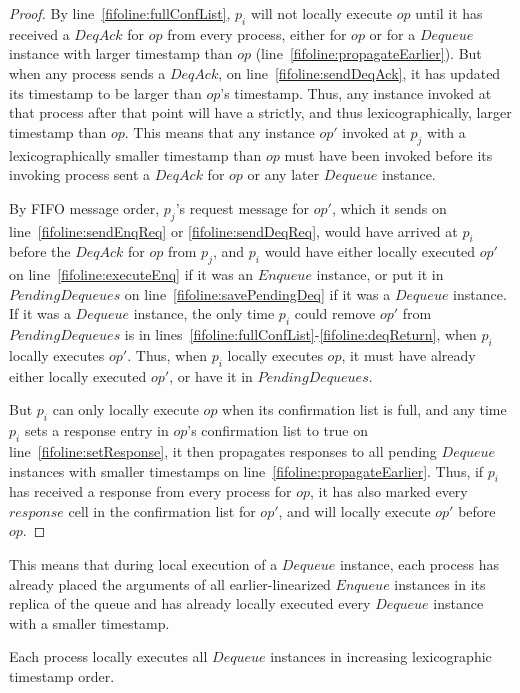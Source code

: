 \documentclass[a4paper,anonymous,USenglish]{lipics-v2021} %
\theoremstyle{definition}
\begin{document}
\begin{proof}
  By line~\ref{fifoline:fullConfList}, $p_i$ will not locally execute $op$ until it has received a $DeqAck$ for $op$ from every process, either for $op$ or for a $Dequeue$ instance with larger timestamp than $op$ (line~\ref{fifoline:propagateEarlier}).  But when any process sends a $DeqAck$, on line~\ref{fifoline:sendDeqAck}, it has updated its timestamp to be larger than $op$'s timestamp.  Thus, any instance invoked at that process after that point will have a strictly, and thus lexicographically, larger timestamp than $op$.  This means that any instance $op'$ invoked at $p_j$ with a lexicographically smaller timestamp than $op$ must have been invoked before its invoking process sent a $DeqAck$ for $op$ or any later $Dequeue$ instance.

  By FIFO message order, $p_j$'s request message for $op'$, which it sends on line~\ref{fifoline:sendEnqReq} or \ref{fifoline:sendDeqReq}, would have arrived at $p_i$ before the $DeqAck$ for $op$ from $p_j$, and $p_i$ would have either locally executed $op'$ on line~\ref{fifoline:executeEnq} if it was an $Enqueue$ instance, or put it in $PendingDequeues$ on line~\ref{fifoline:savePendingDeq} if it was a $Dequeue$ instance.  If it was a $Dequeue$ instance, the only time $p_i$ could remove $op'$ from $PendingDequeues$ is in lines~\ref{fifoline:fullConfList}-\ref{fifoline:deqReturn}, when $p_i$ locally executes $op'$.  Thus, when $p_i$ locally executes $op$, it must have already either locally executed $op'$, or have it in $PendingDequeues$.

  But $p_i$ can only locally execute $op$ when its confirmation list is full, and any time $p_i$ sets a response entry in $op$'s confirmation list to true on line~\ref{fifoline:setResponse}, it then propagates responses to all pending $Dequeue$ instances with smaller timestamps on line~\ref{fifoline:propagateEarlier}.  Thus, if $p_i$ has received a response from every process for $op$, it has also marked every $response$ cell in the confirmation list for $op'$, and will locally execute $op'$ before $op$.
\end{proof}

This means that during local execution of a $Dequeue$ instance, each process has already placed the arguments of all earlier-linearized $Enqueue$ instances in its replica of the queue and has already locally executed every $Dequeue$ instance with a smaller timestamp.  

\begin{corollary}\label{fifolem:localExecOrder}
  Each process locally executes all $Dequeue$ instances in increasing lexicographic timestamp order.
\end{corollary}
\end{document}

